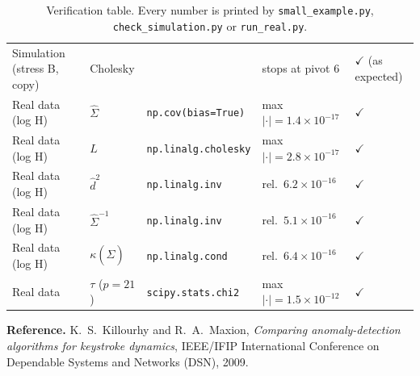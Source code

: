 \documentclass[11pt]{article}
\newcommand{\hSigma}{\hat{\Sigma}}
\newcommand{\code}[1]{\texttt{#1}}
\theoremstyle{plain}
\begin{document}
\begin{table}[H]
\begin{tabular}{@{}lllll@{}}
Simulation (stress B, copy) & Cholesky & & stops at pivot 6 & $\checkmark$ (as expected)\\
Real data (log H) & $\hSigma$ & \code{np.cov(bias=True)} & max $|\cdot|=1.4\times10^{-17}$ & $\checkmark$\\
Real data (log H) & $L$ & \code{np.linalg.cholesky} & max $|\cdot|=2.8\times10^{-17}$ & $\checkmark$\\
Real data (log H) & $\hat d^2$ & \code{np.linalg.inv} & rel.\ $6.2\times10^{-16}$ & $\checkmark$\\
Real data (log H) & $\hSigma^{-1}$ & \code{np.linalg.inv} & rel.\ $5.1\times10^{-16}$ & $\checkmark$\\
Real data (log H) & $\kappa(\hSigma)$ & \code{np.linalg.cond} & rel.\ $6.4\times10^{-16}$ & $\checkmark$\\
Real data & $\tau$ ($p=21$) & \code{scipy.stats.chi2} & max $|\cdot|=1.5\times10^{-12}$ & $\checkmark$\\
\bottomrule
\end{tabular}
\caption{Verification table. Every number is printed by \code{small\_example.py},
\code{check\_simulation.py} or \code{run\_real.py}.}\label{tab:verify}
\end{table}

\bigskip
\textbf{Reference.} K.~S.~Killourhy and R.~A.~Maxion, \emph{Comparing
anomaly-detection algorithms for keystroke dynamics}, IEEE/IFIP International
Conference on Dependable Systems and Networks (DSN), 2009.
\end{document}

